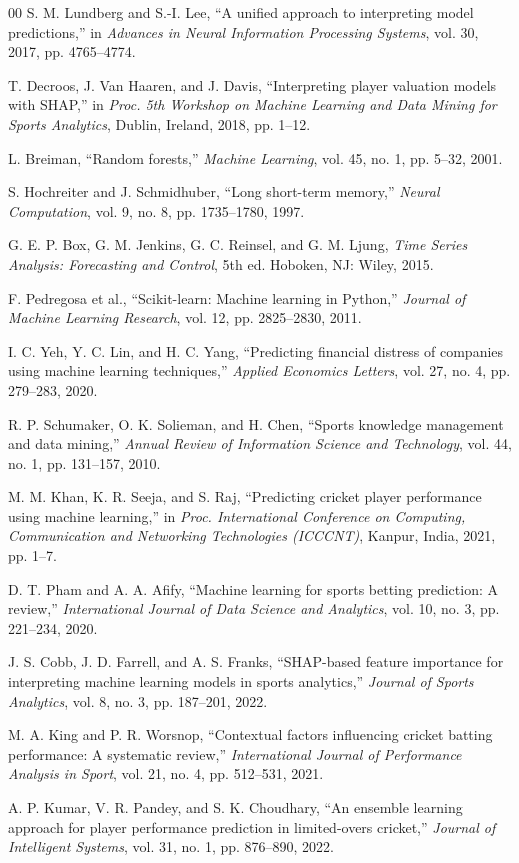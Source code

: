 \documentclass[conference]{IEEEtran}
\begin{document}
\begin{thebibliography}{00}
 S. M. Lundberg and S.-I. Lee, ``A unified approach to interpreting model predictions,'' in \textit{Advances in Neural Information Processing Systems}, vol. 30, 2017, pp. 4765–4774.

 T. Decroos, J. Van Haaren, and J. Davis, ``Interpreting player valuation models with SHAP,'' in \textit{Proc. 5th Workshop on Machine Learning and Data Mining for Sports Analytics}, Dublin, Ireland, 2018, pp. 1–12.

 L. Breiman, ``Random forests,'' \textit{Machine Learning}, vol. 45, no. 1, pp. 5–32, 2001.

 S. Hochreiter and J. Schmidhuber, ``Long short-term memory,'' \textit{Neural Computation}, vol. 9, no. 8, pp. 1735–1780, 1997.

 G. E. P. Box, G. M. Jenkins, G. C. Reinsel, and G. M. Ljung, \textit{Time Series Analysis: Forecasting and Control}, 5th ed. Hoboken, NJ: Wiley, 2015.

 F. Pedregosa et al., ``Scikit-learn: Machine learning in Python,'' \textit{Journal of Machine Learning Research}, vol. 12, pp. 2825–2830, 2011.

 I. C. Yeh, Y. C. Lin, and H. C. Yang, ``Predicting financial distress of companies using machine learning techniques,'' \textit{Applied Economics Letters}, vol. 27, no. 4, pp. 279–283, 2020.

 R. P. Schumaker, O. K. Solieman, and H. Chen, ``Sports knowledge management and data mining,'' \textit{Annual Review of Information Science and Technology}, vol. 44, no. 1, pp. 131–157, 2010.

 M. M. Khan, K. R. Seeja, and S. Raj, ``Predicting cricket player performance using machine learning,'' in \textit{Proc. International Conference on Computing, Communication and Networking Technologies (ICCCNT)}, Kanpur, India, 2021, pp. 1–7.

 D. T. Pham and A. A. Afify, ``Machine learning for sports betting prediction: A review,'' \textit{International Journal of Data Science and Analytics}, vol. 10, no. 3, pp. 221–234, 2020.

 J. S. Cobb, J. D. Farrell, and A. S. Franks, ``SHAP-based feature importance for interpreting machine learning models in sports analytics,'' \textit{Journal of Sports Analytics}, vol. 8, no. 3, pp. 187–201, 2022.

 M. A. King and P. R. Worsnop, ``Contextual factors influencing cricket batting performance: A systematic review,'' \textit{International Journal of Performance Analysis in Sport}, vol. 21, no. 4, pp. 512–531, 2021.

 A. P. Kumar, V. R. Pandey, and S. K. Choudhary, ``An ensemble learning approach for player performance prediction in limited-overs cricket,'' \textit{Journal of Intelligent Systems}, vol. 31, no. 1, pp. 876–890, 2022.

\end{thebibliography}
\end{document}
